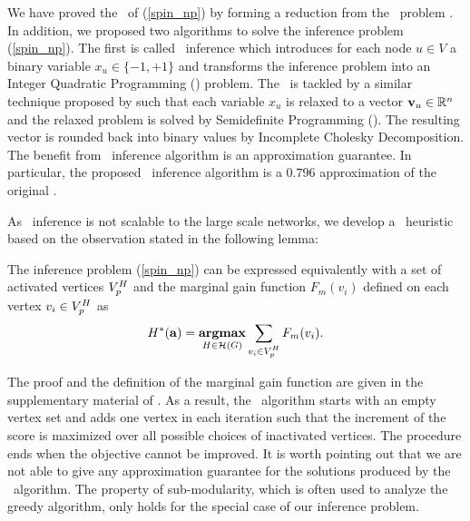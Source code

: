 {We have proved the \nphardness\ of (\ref{spin_np}) by forming a reduction from the \maxcut\ problem \citep{Garey90computers}.
In addition, we proposed two algorithms to solve the inference problem (\ref{spin_np}).
The first is called {\sdp\ inference} which introduces for each node $u\in V$ a binary variable $x_u\in\{-1,+1\}$ and transforms the inference problem into an Integer Quadratic Programming (\iqp) problem.
The \iqp\ is tackled by a similar technique proposed by \citet{Geomans1995improved} such that each variable $x_u$ is relaxed to a vector $\mathbf {v}_u\in\mathbb{R}^n$ and the relaxed problem is solved by Semidefinite Programming (\sdp). 
The resulting vector is rounded back into binary values by Incomplete Cholesky Decomposition.
The benefit from \sdp\ inference algorithm is an approximation guarantee. 
In particular, the proposed \sdp\ inference algorithm is a $0.796$ approximation of the original \iqp.

As \sdp\ inference is not scalable to the large scale networks, we develop a \greedy\ heuristic based on the observation stated in the following lemma:
\begin{lemma}
	The inference problem (\ref{spin_np}) can be expressed equivalently with a set of activated vertices $V^H_{\sc p}$ and the marginal gain function $F_m(v_i)$ defined on each vertex $v_i\in V^H_{\sc p}$ as
	\begin{align*}
		H^{*}(\mathbf {a}) = \underset{{H \in {\cal H}(G)}}{\textbf{argmax}} \sum_{ \substack{v_i\in V^H_{\sc p}}}F_m(v_i).
	\end{align*}
\end{lemma}
\noindent
The proof and the definition of the marginal gain function are given in the supplementary material of . 
As a result, the \greedy\ algorithm starts with an empty vertex set and adds one vertex in each iteration such that the increment of the score is maximized over all possible choices of inactivated vertices.
The procedure ends when the objective cannot be improved.  
It is worth pointing out that we are not able to give any approximation guarantee for the solutions produced by the \greedy\ algorithm.
The property of sub-modularity, which is often used to analyze the greedy algorithm, only holds for the special case of our inference problem.


}

